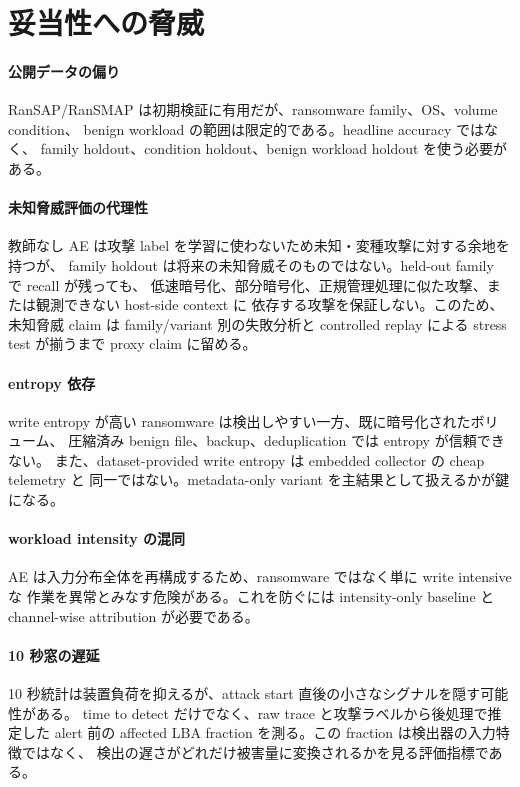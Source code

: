 \section{妥当性への脅威}

\paragraph{公開データの偏り}
RanSAP/RanSMAP は初期検証に有用だが、ransomware family、OS、volume condition、
benign workload の範囲は限定的である。headline accuracy ではなく、
family holdout、condition holdout、benign workload holdout を使う必要がある。

\paragraph{未知脅威評価の代理性}
教師なし AE は攻撃 label を学習に使わないため未知・変種攻撃に対する余地を持つが、
family holdout は将来の未知脅威そのものではない。held-out family で recall が残っても、
低速暗号化、部分暗号化、正規管理処理に似た攻撃、または観測できない host-side context に
依存する攻撃を保証しない。このため、未知脅威 claim は family/variant 別の失敗分析と
controlled replay による stress test が揃うまで proxy claim に留める。

\paragraph{entropy 依存}
write entropy が高い ransomware は検出しやすい一方、既に暗号化されたボリューム、
圧縮済み benign file、backup、deduplication では entropy が信頼できない。
また、dataset-provided write entropy は embedded collector の cheap telemetry と
同一ではない。metadata-only variant を主結果として扱えるかが鍵になる。

\paragraph{workload intensity の混同}
AE は入力分布全体を再構成するため、ransomware ではなく単に write intensive な
作業を異常とみなす危険がある。これを防ぐには intensity-only baseline と
channel-wise attribution が必要である。

\paragraph{10 秒窓の遅延}
10 秒統計は装置負荷を抑えるが、attack start 直後の小さなシグナルを隠す可能性がある。
time to detect だけでなく、raw trace と攻撃ラベルから後処理で推定した
alert 前の affected LBA fraction を測る。この fraction は検出器の入力特徴ではなく、
検出の遅さがどれだけ被害量に変換されるかを見る評価指標である。

